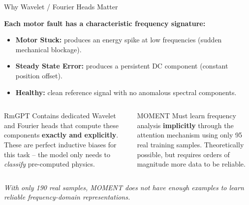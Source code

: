 \documentclass{beamer}
\begin{document}
\begin{frame}{Why Wavelet / Fourier Heads Matter}

    \textbf{Each motor fault has a characteristic frequency signature:}

    \begin{itemize}
        \item \textbf{Motor Stuck:} produces an energy spike at low frequencies (sudden mechanical blockage).
        \item \textbf{Steady State Error:} produces a persistent DC component (constant position offset).
        \item \textbf{Healthy:} clean reference signal with no anomalous spectral components.
    \end{itemize}

    \vspace{0.3cm}
    \begin{columns}
        \begin{exampleblock}{RmGPT}
            Contains dedicated Wavelet and Fourier heads that compute these components \textbf{exactly and explicitly}. These are perfect inductive biases for this task -- the model only needs to \textit{classify} pre-computed physics.
        \end{exampleblock}

        \begin{alertblock}{MOMENT}
            Must learn frequency analysis \textbf{implicitly} through the attention mechanism using only 95 real training samples. Theoretically possible, but requires orders of magnitude more data to be reliable.
        \end{alertblock}
    \end{columns}

    \vspace{0.2cm}
    \centering
    \textit{With only 190 real samples, MOMENT does not have enough examples to learn reliable frequency-domain representations.}
\end{frame}
\end{document}
